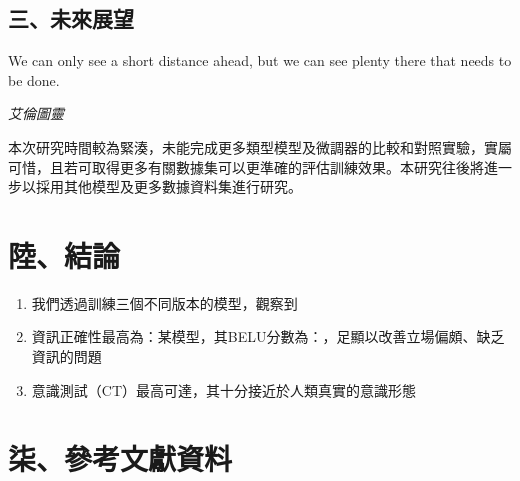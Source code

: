 \documentclass[8pt,a4paper,MingLiU,UTF8]{article}
\begin{document}
	\subsection{三、未來展望}
	\epigraph{	We can only see a short distance ahead, but we can see plenty there that needs to be done.}{\textit{艾倫圖靈}}
	本次研究時間較為緊湊，未能完成更多類型模型及微調器的比較和對照實驗，實屬可惜，且若可取得更多有關數據集可以更準確的評估訓練效果。本研究往後將進一步以採用其他模型及更多數據資料集進行研究。

	\section{陸、結論}
		\begin{enumerate}
			\item 我們透過訓練三個不同版本的模型，觀察到
			\item 資訊正確性最高為：某模型，其BELU分數為：，足顯以改善立場偏頗、缺乏資訊的問題
			\item 意識測試（CT）最高可達，其十分接近於人類真實的意識形態
		\end{enumerate}
	\section{柒、參考文獻資料}
	
	\renewcommand{\refname}{}
	
\end{document}
